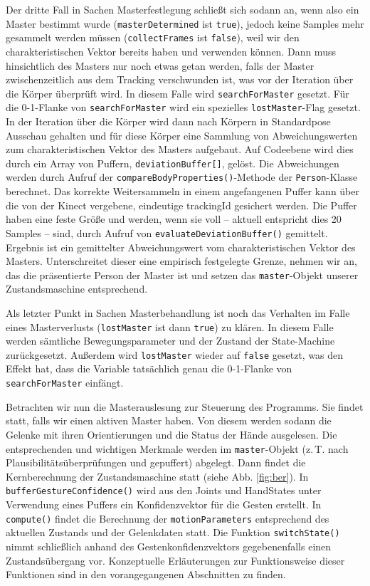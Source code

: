 Der dritte Fall in Sachen Masterfestlegung schließt sich sodann an, wenn also ein Master bestimmt wurde (\texttt{masterDetermined} ist \texttt{true}), jedoch keine Samples mehr gesammelt werden müssen (\texttt{collectFrames} ist \texttt{false}), weil wir den charakteristischen Vektor bereits haben und verwenden können. Dann muss hinsichtlich des Masters nur noch etwas getan werden, falls der Master zwischenzeitlich aus dem Tracking verschwunden ist, was vor der Iteration über die Körper überprüft wird. In diesem Falle wird \texttt{searchForMaster} gesetzt. Für die 0-1-Flanke von \texttt{searchForMaster} wird ein spezielles \texttt{lostMaster}-Flag gesetzt. In der Iteration über die Körper wird dann nach Körpern in Standardpose Ausschau gehalten und für diese Körper eine Sammlung von Abweichungswerten zum charakteristischen Vektor des Masters aufgebaut. Auf Codeebene wird dies durch ein Array von Puffern, \texttt{deviationBuffer[]}, gelöst. Die Abweichungen werden durch Aufruf der \texttt{compareBodyProperties()}-Methode der \texttt{Person}-Klasse berechnet. Das korrekte Weitersammeln in einem angefangenen Puffer kann über die von der Kinect vergebene, eindeutige trackingId gesichert werden. Die Puffer haben eine feste Größe und werden, wenn sie voll -- aktuell entspricht dies 20 Samples -- sind, durch Aufruf von \texttt{evaluateDeviationBuffer()} gemittelt. Ergebnis ist ein gemittelter Abweichungswert vom charakteristischen Vektor des Masters. Unterschreitet dieser eine empirisch festgelegte Grenze, nehmen wir an, das die präsentierte Person der Master ist und setzen das \texttt{master}-Objekt unserer Zustandsmaschine entsprechend.\par 
Als letzter Punkt in Sachen Masterbehandlung ist noch das Verhalten im Falle eines Masterverlusts (\texttt{lostMaster} ist dann \texttt{true}) zu klären. In diesem Falle werden sämtliche Bewegungsparameter und der Zustand der State-Machine zurückgesetzt. Außerdem wird \texttt{lostMaster} wieder auf \texttt{false} gesetzt, was den Effekt hat, dass die Variable tatsächlich genau die 0-1-Flanke von \texttt{searchForMaster} einfängt.\par\medskip
Betrachten wir nun die Masterauslesung zur Steuerung des Programms. Sie findet statt, falls wir einen aktiven Master haben. Von diesem werden sodann die Gelenke mit ihren Orientierungen und die Status der Hände ausgelesen. Die entsprechenden und wichtigen Merkmale werden im \texttt{master}-Objekt (z.\,T. nach Plausibilitätsüberprüfungen und gepuffert) abgelegt. Dann findet die Kernberechnung der Zustandsmaschine statt (siehe Abb. \ref{fig:ber}). In \texttt{bufferGestureConfidence()} wird aus den Joints und HandStates unter Verwendung eines Puffers ein Konfidenzvektor für die Gesten erstellt. In \texttt{compute()} findet die Berechnung der \texttt{motionParameters} entsprechend des aktuellen Zustands und der Gelenkdaten statt. Die Funktion \texttt{switchState()} nimmt schließlich anhand des Gestenkonfidenzvektors gegebenenfalls einen Zustandsübergang vor. Konzeptuelle Erläuterungen zur Funktionsweise dieser Funktionen sind in den vorangegangenen Abschnitten zu finden.\par\medskip
